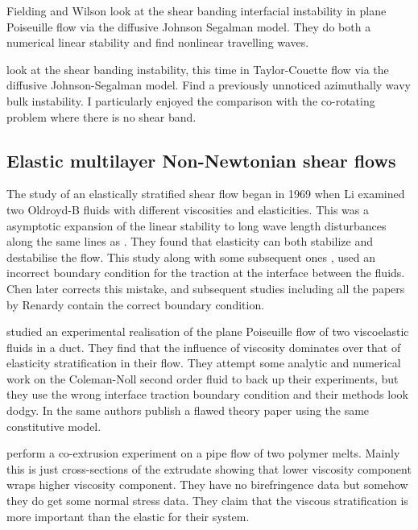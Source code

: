 \documentclass{jfm}
\begin{document}
Fielding and Wilson \citep{Fielding2010} look at the shear banding interfacial
instability in plane Poiseuille flow via the diffusive Johnson Segalman model.
They do both a numerical linear stability and find nonlinear travelling
waves.

\citet{Nicolas2012} look at the shear banding instability, this
time in Taylor-Couette flow via the diffusive Johnson-Segalman model. Find a
previously unnoticed azimuthally wavy bulk instability. I particularly enjoyed
the comparison with the co-rotating problem where there is no shear band.

\subsection{Elastic multilayer Non-Newtonian shear flows}

The study of an elastically stratified shear flow began in 1969 when Li
\citep{Li1969} examined two Oldroyd-B fluids with different viscosities and
elasticities. This was a asymptotic expansion of the linear stability to long
wave length disturbances along the same lines as \citet{Yih1967}. They found
that elasticity can both stabilize and destabilise the flow. This study along
with some subsequent ones \citep{Waters1987, Anturkar1990}, used an incorrect
boundary condition for the traction at the interface between the fluids. Chen
\citep{Chen1991b} later corrects this mistake, and subsequent studies including
all the papers by Renardy contain the correct boundary condition.

\citet{Khan1976} studied an experimental realisation of the plane Poiseuille
flow of two viscoelastic fluids in a duct. They find that the influence of
viscosity dominates over that of elasticity stratification in their flow. They
attempt some analytic and numerical work on the Coleman-Noll second order fluid
to back up their experiments, but they use the wrong interface traction
boundary condition and their methods look dodgy. In \citet{Khan1977} the same
authors publish a flawed theory paper using the same constitutive model.

\citet{Han1985} perform a co-extrusion experiment on a pipe flow of two polymer
melts. Mainly this is just cross-sections of the extrudate showing that lower
viscosity component wraps higher viscosity component. They have no
birefringence data but somehow they do get some normal stress data. They claim
that the viscous stratification is more important than the elastic for their
system.
\end{document}
